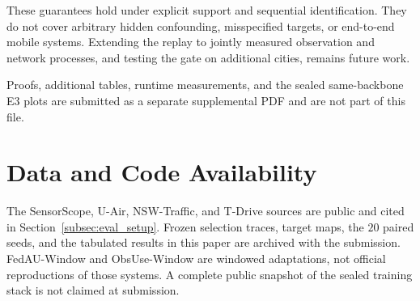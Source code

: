 \documentclass[letterpaper,journal]{IEEEtran}
\begin{document}
These guarantees hold under explicit support and sequential
identification.  They do not cover arbitrary hidden confounding,
misspecified targets, or end-to-end mobile systems.  Extending the
replay to jointly measured observation and network processes, and
testing the gate on additional cities, remains future work.

Proofs, additional tables, runtime measurements, and the sealed
same-backbone E3 plots are submitted as a separate supplemental PDF
and are not part of this file.

\section*{Data and Code Availability}
The SensorScope, U-Air, NSW-Traffic, and T-Drive sources are public
and cited in Section~\ref{subsec:eval_setup}.  Frozen selection traces,
target maps, the $20$ paired seeds, and the tabulated results in this
paper are archived with the submission.  FedAU-Window and ObsUse-Window
are windowed adaptations, not official reproductions of those systems.
A complete public snapshot of the sealed training stack is not claimed
at submission.



\end{document}
